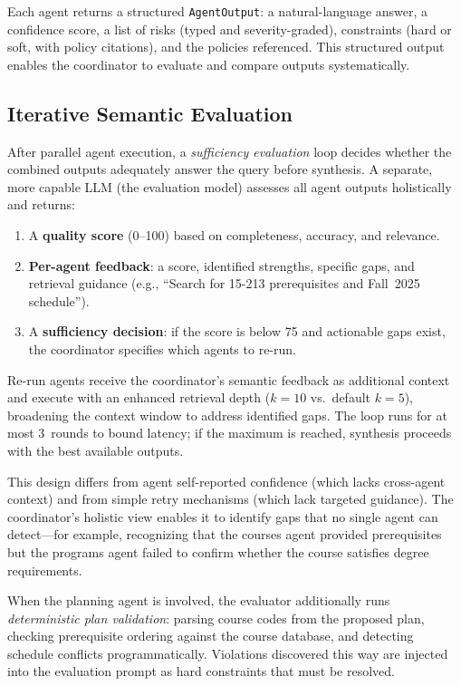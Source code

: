 Each agent returns a structured \texttt{AgentOutput}: a natural-language answer, a confidence score, a list of risks (typed and severity-graded), constraints (hard or soft, with policy citations), and the policies referenced. This structured output enables the coordinator to evaluate and compare outputs systematically.

\subsection{Iterative Semantic Evaluation}
\label{sec:eval-loop}

After parallel agent execution, a \emph{sufficiency evaluation} loop decides whether the combined outputs adequately answer the query before synthesis. A separate, more capable LLM (the evaluation model) assesses all agent outputs holistically and returns:

\begin{enumerate}
    \item A \textbf{quality score} (0--100) based on completeness, accuracy, and relevance.
    \item \textbf{Per-agent feedback}: a score, identified strengths, specific gaps, and retrieval guidance (e.g., ``Search for 15-213 prerequisites and Fall~2025 schedule'').
    \item A \textbf{sufficiency decision}: if the score is below 75 and actionable gaps exist, the coordinator specifies which agents to re-run.
\end{enumerate}

Re-run agents receive the coordinator's semantic feedback as additional context and execute with an enhanced retrieval depth ($k{=}10$ vs.\ default $k{=}5$), broadening the context window to address identified gaps. The loop runs for at most 3~rounds to bound latency; if the maximum is reached, synthesis proceeds with the best available outputs.

This design differs from agent self-reported confidence (which lacks cross-agent context) and from simple retry mechanisms (which lack targeted guidance). The coordinator's holistic view enables it to identify gaps that no single agent can detect---for example, recognizing that the courses agent provided prerequisites but the programs agent failed to confirm whether the course satisfies degree requirements.

When the planning agent is involved, the evaluator additionally runs \emph{deterministic plan validation}: parsing course codes from the proposed plan, checking prerequisite ordering against the course database, and detecting schedule conflicts programmatically. Violations discovered this way are injected into the evaluation prompt as hard constraints that must be resolved.


